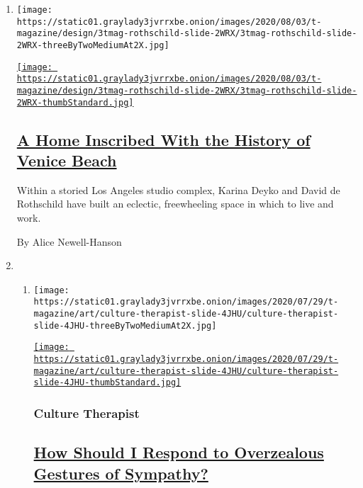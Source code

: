 \begin{enumerate}
\def\labelenumi{\arabic{enumi}.}
\item
  \texttt{[image: https://static01.graylady3jvrrxbe.onion/images/2020/08/03/t-magazine/design/3tmag-rothschild-slide-2WRX/3tmag-rothschild-slide-2WRX-threeByTwoMediumAt2X.jpg]}

  \href{/2020/08/03/t-magazine/david-de-rothschild-venice-home-design.html}{\texttt{[image: https://static01.graylady3jvrrxbe.onion/images/2020/08/03/t-magazine/design/3tmag-rothschild-slide-2WRX/3tmag-rothschild-slide-2WRX-thumbStandard.jpg]}}

  \hypertarget{a-home-inscribed-with-the-history-of-venice-beach}{%
  \subsection{\texorpdfstring{\href{/2020/08/03/t-magazine/david-de-rothschild-venice-home-design.html}{A
  Home Inscribed With the History of Venice
  Beach}}{A Home Inscribed With the History of Venice Beach}}\label{a-home-inscribed-with-the-history-of-venice-beach}}

  Within a storied Los Angeles studio complex, Karina Deyko and David de
  Rothschild have built an eclectic, freewheeling space in which to live
  and work.

  By Alice Newell-Hanson
\item
  \begin{enumerate}
  \def\labelenumii{\arabic{enumii}.}
  \item
    \texttt{[image: https://static01.graylady3jvrrxbe.onion/images/2020/07/29/t-magazine/art/culture-therapist-slide-4JHU/culture-therapist-slide-4JHU-threeByTwoMediumAt2X.jpg]}

    \href{/2020/07/31/t-magazine/culture-therapist-grief.html}{\texttt{[image: https://static01.graylady3jvrrxbe.onion/images/2020/07/29/t-magazine/art/culture-therapist-slide-4JHU/culture-therapist-slide-4JHU-thumbStandard.jpg]}}

    \hypertarget{culture-therapist}{%
    \subsubsection{Culture Therapist}\label{culture-therapist}}

    \hypertarget{how-should-i-respond-to-overzealous-gestures-of-sympathy}{%
    \subsection{\texorpdfstring{\href{/2020/07/31/t-magazine/culture-therapist-grief.html}{How
    Should I Respond to Overzealous Gestures of
    Sympathy?}}{How Should I Respond to Overzealous Gestures of Sympathy?}}\label{how-should-i-respond-to-overzealous-gestures-of-sympathy}}


\end{enumerate}
\end{enumerate}
